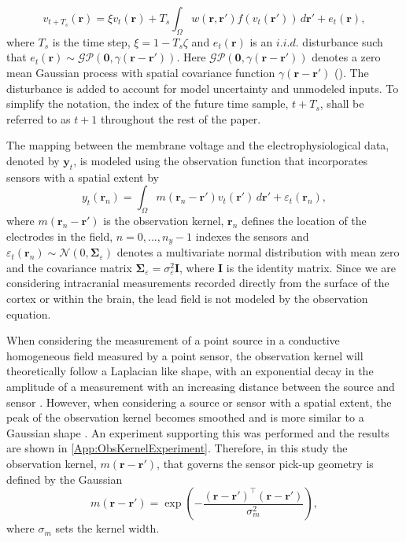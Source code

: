 \documentclass[review,authoryear,3p]{elsarticle}
\begin{document}
\begin{equation}
	\label{DiscreteTimeModel} 
	v_{t+T_s}\left(\mathbf{r}\right) = 
	\xi v_t\left(\mathbf{r}\right) + 
	T_s \int_\Omega { 
	    w\left(\mathbf{r},\mathbf{r}'\right)
	    f\left(v_t\left(\mathbf{r}'\right)\right) 
	\, d\mathbf{r}'} 
	+ e_t\left(\mathbf{r}\right), 
\end{equation}
where $T_s$ is the time step, $\xi = 1-T_s\zeta $ and $e_t(\mathbf{r})$ is an $i.i.d.$ disturbance such that $e_t(\mathbf{r})\sim\mathcal{GP}(\mathbf 0,\gamma(\mathbf{r}-\mathbf{r}'))$. Here $\mathcal{GP}(\mathbf 0,\gamma(\mathbf{r}-\mathbf{r}'))$ denotes a zero mean Gaussian process with spatial covariance function $\gamma(\mathbf{r}-\mathbf{r}')$ (\cite{Rasmussen2005}). The disturbance is added to account for model uncertainty and unmodeled inputs. To simplify the notation, the index of the future time sample, $t+T_s$, shall be referred to as $t+1$ throughout the rest of the paper. 

The mapping between the membrane voltage and the electrophysiological data, denoted by $\mathbf{y}_t$, is modeled using the observation function that incorporates sensors with a spatial extent by
\begin{equation}\label{eq:ObservationEquation}
	y_t(\mathbf{r}_n) = \int_{\Omega} { m\left(\mathbf{r}_n-\mathbf{r}'\right) v_t\left(\mathbf{r}'\right) \, d\mathbf{r}'} + \varepsilon_t(\mathbf{r}_n), 
\end{equation}
where $m\left(\mathbf{r}_n-\mathbf{r}'\right)$ is the observation kernel, $\mathbf{r}_n$ defines the location of the electrodes in the field, $n=0,...,n_y-1$ indexes the sensors and $\varepsilon_t(\mathbf{r}_n) \sim \mathcal{N}\left(0,\boldsymbol{\Sigma}_{\varepsilon}\right)$ denotes a multivariate normal distribution with mean zero and the covariance matrix $\boldsymbol{\Sigma}_{\varepsilon} = \sigma_{\varepsilon}^2\mathbf{I}$, where $\mathbf{I}$ is the identity matrix. Since we are considering intracranial measurements recorded directly from the surface of the cortex or within the brain, the lead field is not modeled by the observation equation.

When considering the measurement of a point source in a conductive homogeneous field measured by a point sensor, the observation kernel will theoretically follow a Laplacian like shape, with an exponential decay in the amplitude of a measurement with an increasing distance between the source and sensor \citep{Jackson1999}. However, when considering a source or sensor with a spatial extent, the peak of the observation kernel becomes smoothed and is more similar to a Gaussian shape \citep{Jackson1999}. An experiment supporting this was performed and the results are shown in \ref{App:ObsKernelExperiment}. Therefore, in this study the observation kernel, $m(\mathbf{r}-\mathbf{r}')$, that governs the sensor pick-up geometry is defined by the Gaussian
\begin{equation}
	m\left(\mathbf{r}-\mathbf{r}'\right) = \exp{\left(-\frac{(\mathbf{r}-\mathbf{r}')^\top(\mathbf{r}-\mathbf{r}')}{\sigma_m^2}\right)},
\end{equation}
where $\sigma_m$ sets the kernel width. 
\end{document}
